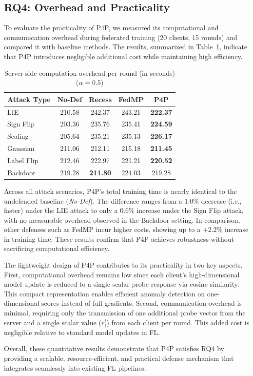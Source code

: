\subsection{RQ4: Overhead and Practicality}
\label{sec:rq4}

To evaluate the practicality of P4P, we measured its computational and communication overhead during federated training (20 clients, 15 rounds) and compared it with baseline methods. The results, summarized in Table~\ref{tab:training_time_pivoted}, indicate that P4P introduces negligible additional cost while maintaining high efficiency.

\begin{table}[h!]
\centering
\caption{Server-side computation overhead per round (in seconds) ($\alpha = 0.5$)}
\label{tab:training_time_pivoted}
\begin{tabular}{l | c c c c}
\hline
Attack Type & No-Def & Recess & FedMP & P4P \\
\hline
LIE & 210.58 & 242.37 & 243.21 & \textbf{222.37} \\
Sign Flip & 203.36 & 235.76 & 235.41 & \textbf{224.59} \\
Scaling & 205.64 & 235.21 & 235.13 & \textbf{226.17} \\
Gaussian& 211.06 & 212.11 & 215.18 & \textbf{211.45} \\
Label Flip & 212.46 & 222.97 & 221.21 & \textbf{220.52} \\
Backdoor& 219.28 & \textbf{211.80} & 224.03 & 219.28 \\
\hline
\end{tabular}
\end{table}

Across all attack scenarios, P4P’s total training time is nearly identical to the undefended baseline (\textit{No-Def}). The difference ranges from a 1.0\% decrease (i.e., faster) under the LIE attack to only a 0.6\% increase under the Sign Flip attack, with no measurable overhead observed in the Backdoor setting. In comparison, other defenses such as FedMP incur higher costs, showing up to a +2.2\% increase in training time. These results confirm that P4P achieves robustness without sacrificing computational efficiency.

The lightweight design of P4P contributes to its practicality in two key aspects. First, computational overhead remains low since each client’s high-dimensional model update is reduced to a single scalar probe response via cosine similarity. This compact representation enables efficient anomaly detection on one-dimensional scores instead of full gradients. Second, communication overhead is minimal, requiring only the transmission of one additional probe vector from the server and a single scalar value ($r_i^t$) from each client per round. This added cost is negligible relative to standard model updates in FL.

Overall, these quantitative results demonstrate that P4P satisfies RQ4 by providing a scalable, resource-efficient, and practical defense mechanism that integrates seamlessly into existing FL pipelines.